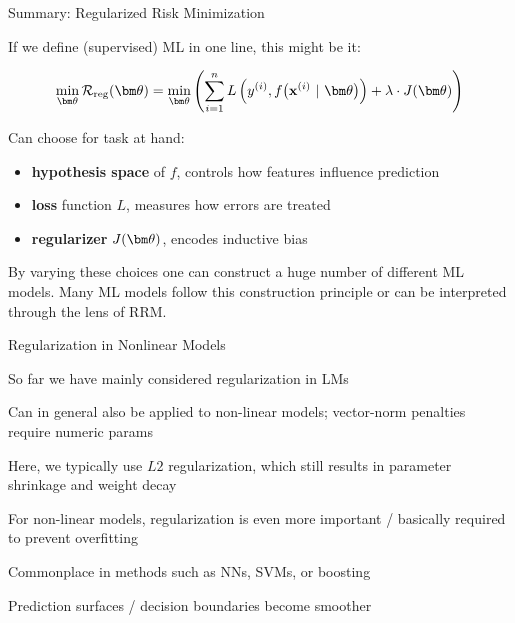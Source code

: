 \documentclass[11pt,compress,t,notes=noshow, xcolor=table]{beamer}
\begin{document}




\begin{frame}{Summary: Regularized Risk Minimization}

If we define (supervised) ML in one line, this might be it:

$$
\min_{\thetav} \riskrt= \min_{\thetav} \left(\sumin \Lxyit + \lambda \cdot J(\thetav) \right)
$$

Can choose for task at hand:

\begin{itemize}
  \item \textbf{hypothesis space} of $f$, controls how features influence prediction
  \item \textbf{loss} function $L$, measures how errors are treated
  \item \textbf{regularizer} $J(\thetav)$, encodes inductive bias 
\end{itemize}

\vfill

By varying these choices one can construct a huge number of different ML models. 
Many ML models follow this construction principle or can be interpreted through 
the lens of RRM.

\end{frame}


\begin{framei}[sep=L]{Regularization in Nonlinear Models}

  \item So far we have mainly considered regularization in LMs
  \item Can in general also be applied to non-linear models; vector-norm penalties require numeric params 
  \item Here, we typically use $L2$ regularization, which
    still results in parameter shrinkage and weight decay
  \item For non-linear models, regularization is even more important / basically required to prevent overfitting
  \item Commonplace in methods such as NNs, SVMs, or boosting
  \item Prediction surfaces / decision boundaries become smoother

\end{framei}
\end{document}

